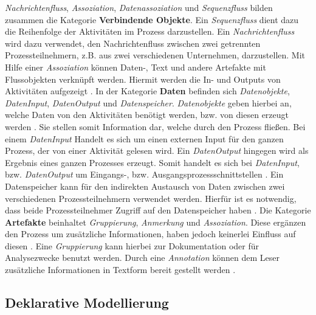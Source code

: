\textit{Nachrichtenfluss}, \textit{Assoziation}, \textit{Datenassoziation} und \textit{Sequenzfluss} bilden zusammen die Kategorie \textbf{Verbindende Objekte}. Ein \textit{Sequenzfluss} dient dazu die Reihenfolge der Aktivitäten im Prozess darzustellen. Ein \textit{Nachrichtenfluss} wird dazu verwendet, den Nachrichtenfluss zwischen zwei getrennten Prozessteilnehmern, z.B. aus zwei verschiedenen Unternehmen, darzustellen. Mit Hilfe einer \textit{Assoziation} können Daten-, Text und andere Artefakte mit Flussobjekten verknüpft werden. Hiermit werden die In- und Outputs von Aktivitäten aufgezeigt \cite{white2004}. \newline
In der Kategorie \textbf{Daten} befinden sich \textit{Datenobjekte}, \textit{DatenInput}, \textit{DatenOutput} und \textit{Datenspeicher}. \textit{Datenobjekte} geben hierbei an, welche Daten von den Aktivitäten benötigt werden, bzw. von diesen erzeugt werden \cite{white2004}. Sie stellen somit Information dar, welche durch den Prozess fließen. Bei einem  \textit{DatenInput} Handelt es sich um einen externen Input für den ganzen Prozess, der von einer Aktivität gelesen wird. Ein \textit{DatenOutput} hingegen wird als Ergebnis eines ganzen Prozesses erzeugt. Somit handelt es sich bei \textit{DatenInput}, bzw. \textit{DatenOutput} um Eingangs-, bzw. Ausgangsprozessschnittstellen \cite{bpmnposter}. Ein Datenspeicher kann für den indirekten Austausch von Daten zwischen zwei verschiedenen Prozessteilnehmern verwendet werden. Hierfür ist es notwendig, dass beide Prozessteilnehmer Zugriff auf den Datenspeicher haben \cite{allweyer2013}.
Die Kategorie \textbf{Artefakte} beinhaltet \textit{Gruppierung}, \textit{Anmerkung} und \textit{Assoziation}.  Diese ergänzen den Prozess um zusätzliche Informationen, haben jedoch keinerlei Einfluss auf diesen \cite{gpfert2012}. Eine \textit{Gruppierung} kann hierbei zur Dokumentation oder für Analysezwecke benutzt werden. Durch eine \textit{Annotation} können dem Leser zusätzliche Informationen in Textform bereit gestellt werden \cite{white2004}.




\subsection{Deklarative Modellierung}

